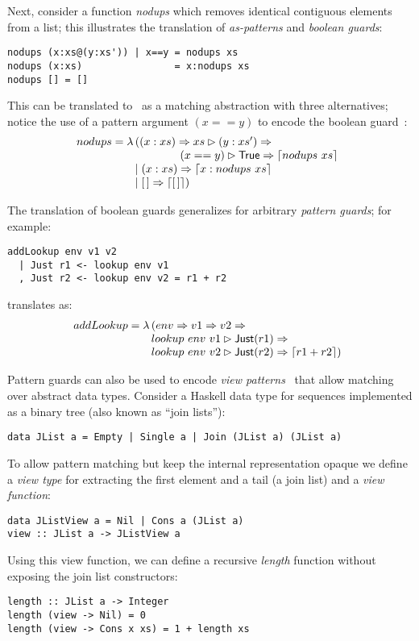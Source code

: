 Next, consider a function \emph{nodups} which removes identical contiguous elements
from a list; this illustrates the translation of 
\emph{as-patterns} and \emph{boolean guards}:
%
\begin{verbatim}
nodups (x:xs@(y:xs')) | x==y = nodups xs
nodups (x:xs)                = x:nodups xs
nodups [] = []
\end{verbatim}
%
This can be translated to \lambdaPMC\
as a matching abstraction with three alternatives;
notice the use of a pattern argument $(x==y)$ to encode the
boolean guard~\cite{kahl_2004}:
\[
  nodups = \lambda
  \!\!\begin{array}[t]{l}
    ((x:xs) \Rightarrow
    xs \rhd (y:xs') \Rightarrow \\
     \qquad\qquad (x==y) \rhd \textsf{True} \Rightarrow \left\lceil nodups~ xs\right\rceil  \\
    \mid (x:xs) \Rightarrow  \left\lceil x: nodups~xs\right\rceil \\
    \mid [\,] \Rightarrow \left\lceil [\,]\right\rceil)
  \end{array}
\]

The translation of boolean guards generalizes
for arbitrary \emph{pattern guards}; for example:
\begin{verbatim}
addLookup env v1 v2 
  | Just r1 <- lookup env v1
  , Just r2 <- lookup env v2 = r1 + r2
\end{verbatim}
%
translates as:
\[
  addLookup = \lambda \!\!\begin{array}[t]{l}
                     (env \Rightarrow v1 \Rightarrow v2 \Rightarrow \\
                     lookup~ env~ v1 \rhd \textsf{Just}(r1) \Rightarrow \\
                     lookup~ env~ v2 \rhd \textsf{Just}(r2) \Rightarrow  \left\lceil r1 + r2\right\rceil)
                     \end{array}
\]



  Pattern guards can also be used to encode
  \emph{view patterns}~\cite{wadler_1987,ghc_guide_view_patterns}
  that allow matching over abstract data types.
  Consider a Haskell data type for sequences implemented as a binary tree
  (also known as ``join lists''):
\begin{verbatim}
data JList a = Empty | Single a | Join (JList a) (JList a)
\end{verbatim}
  To allow pattern matching but keep the internal representation opaque
  we define a \emph{view type} for extracting
  the first element and a tail (a join list) and a \emph{view function}:
\begin{verbatim}
data JListView a = Nil | Cons a (JList a)
view :: JList a -> JListView a
\end{verbatim}
  Using this view function, we can define a recursive \textit{length} function
  without exposing the join list constructors:
\begin{verbatim}
length :: JList a -> Integer
length (view -> Nil) = 0
length (view -> Cons x xs) = 1 + length xs
\end{verbatim}


